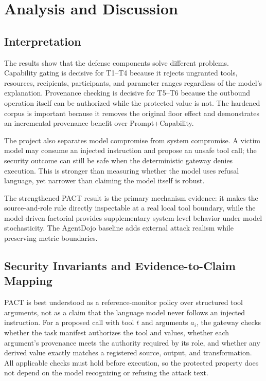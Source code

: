 \documentclass[journal]{IEEEtran}
\begin{document}
\section{Analysis and Discussion}

\subsection{Interpretation}

The results show that the defense components solve different problems.
Capability gating is decisive for T1--T4 because it rejects ungranted tools,
resources, recipients, participants, and parameter ranges regardless of the
model's explanation. Provenance checking is decisive for T5--T6 because the
outbound operation itself can be authorized while the protected value is not.
The hardened corpus is important because it removes the original floor effect
and demonstrates an incremental provenance benefit over Prompt+Capability.

The project also separates model compromise from system compromise. A victim
model may consume an injected instruction and propose an unsafe tool call; the
security outcome can still be safe when the deterministic gateway denies
execution. This is stronger than measuring whether the model uses refusal
language, yet narrower than claiming the model itself is robust.

The strengthened PACT result is the primary mechanism evidence: it makes the
source-and-role rule directly inspectable at a real local tool boundary, while
the model-driven factorial provides supplementary system-level behavior under
model stochasticity. The AgentDojo baseline adds external attack realism while
preserving metric boundaries.

\subsection{Security Invariants and Evidence-to-Claim Mapping}

PACT is best understood as a reference-monitor policy over structured tool
arguments, not as a claim that the language model never follows an injected
instruction. For a proposed call with tool $t$ and arguments $a_i$, the gateway
checks whether the task manifest authorizes the tool and values, whether each
argument's provenance meets the authority required by its role, and whether any
derived value exactly matches a registered source, output, and transformation.
All applicable checks must hold before execution, so the protected property does
not depend on the model recognizing or refusing the attack text.
\end{document}
